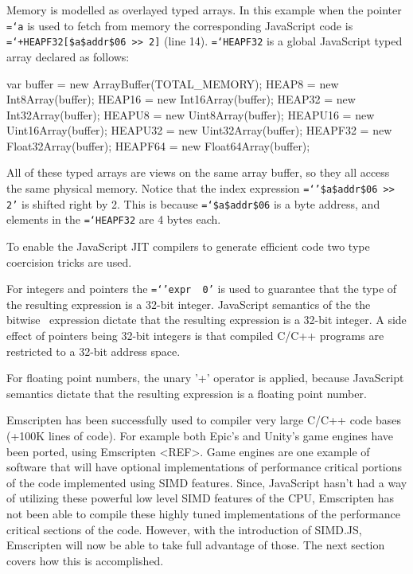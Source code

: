 \documentclass[preprint]{sigplanconf}
\newcommand{\ttt}[1]{{\texttt{\hyphenchar\font=`\-\relax #1}}}%
\begin{document}
Memory is modelled as overlayed typed arrays.
In this example when the pointer \ttt{*a} is used to fetch from memory the corresponding
JavaScript code is \ttt{+HEAPF32[\$a\$addr\$06 >> 2]} (line 14).
\ttt{HEAPF32} is a global JavaScript typed array declared as follows:

\smallskip
\begin{program}[style=tt]
var buffer = new ArrayBuffer(TOTAL\_MEMORY);\newline
HEAP8 = new Int8Array(buffer);\newline
HEAP16 = new Int16Array(buffer);\newline
HEAP32 = new Int32Array(buffer);\newline
HEAPU8 = new Uint8Array(buffer);\newline
HEAPU16 = new Uint16Array(buffer);\newline
HEAPU32 = new Uint32Array(buffer);\newline
HEAPF32 = new Float32Array(buffer);\newline
HEAPF64 = new Float64Array(buffer);\newline
\end{program}
\smallskip

All of these typed arrays are views on the same array buffer, so they all
access the same physical memory.  Notice that the index expression
\ttt{'\$a\$addr\$06 >> 2'} is shifted right by 2.
This is because \ttt{\$a\$addr\$06} is a byte address, and elements in the
\ttt{HEAPF32} are 4 bytes each.

To enable the JavaScript JIT compilers to generate efficient code two
type coercision tricks are used.

For integers and pointers the \ttt{'expr \textbar\ 0'} is used to guarantee
that the type of the resulting expression is a 32-bit integer.  JavaScript
semantics of the the bitwise \textbar\ expression dictate that the resulting
expression is a 32-bit integer.  A side effect of pointers being 32-bit integers
is that compiled C/C++ programs are restricted to a 32-bit address space.

For floating point numbers, the unary '+' operator is applied, because JavaScript
semantics dictate that the resulting expression is a floating point number.

Emscripten has been successfully used to compiler very large C/C++ code
bases (+100K lines of code).  For example both Epic's and Unity's game engines
have been ported, using Emscripten <REF>.  Game engines are one example of
software that will have optional implementations of performance critical
portions of the code implemented using SIMD features.  Since, JavaScript
hasn't had a way of utilizing these powerful low level SIMD features of the
CPU, Emscripten has not been able to compile these highly tuned implementations
of the performance critical sections of the code. However, with the introduction
of SIMD.JS, Emscripten will now be able to take full advantage of those.  The next
section covers how this is accomplished.
\end{document}
